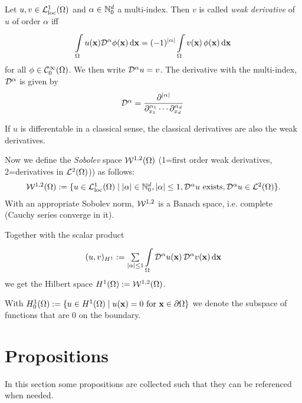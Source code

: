 Let $u,v\in \mathcal{L}^1_{\text{loc}}(\Omega)$ and $\alpha \in \mathbb{N}^d_0$ a multi-index. Then $v$ is called \emph{weak derivative} of $u$ of order $\alpha$ iff
\begin{equation}
  \begin{array}{ll}
    \i{\Omega}{}u(\bfx) \D^\alpha \phi(\bfx) \,\d \bfx = (-1)^{|\alpha|} \i{\Omega}{} v(\bfx)\,\phi(\bfx)\,\d \bfx
  \end{array}
\end{equation}
for all $\phi \in \mathcal{C}^\infty_0(\Omega)$. We then write $\mathcal{D}^\alpha u = v$. The derivative with the multi-index, $\mathcal{D}^\alpha$ is given by
\begin{equation}
  \begin{array}{ll}
    \D^\alpha = \dfrac{\p^{|\alpha|}}{\p^{\alpha_1}_{x_1} \cdots \p^{\alpha_d}_{x_d}}
  \end{array}
\end{equation}

If $u$ is differentable in a classical sense, the classical derivatives are also the weak derivatives. 

Now we define the \emph{Sobolev} space $\mathcal{W}^{1,2}(\Omega)$ (1=first order weak derivatives, 2=derivatives in $\mathcal{L}^2(\Omega)$)) as follows:
\begin{equation}
  \begin{array}{ll}
    \mathcal{W}^{1,2}(\Omega) := \{ u \in \mathcal{L}^1_{\text{loc}}(\Omega) \mid |\alpha| \in \mathbb{N}^d_0, |\alpha| \leq 1, \mathcal{D}^\alpha u \text{ exists}, \mathcal{D}^\alpha u \in \mathcal{L}^2(\Omega)\}.
  \end{array}
\end{equation}
With an appropriate Sobolev norm, $\mathcal{W}^{1,2}$ is a Banach space, i.e. complete (Cauchy series converge in it).

Together with the scalar product
\begin{equation}
  \begin{array}{ll}
    (u,v)_{H^1} := \sum\limits_{|\alpha|\leq 1} \i{\Omega}{}{\D^\alpha u(\bfx) \,\D^\alpha v(\bfx) \,\d\bfx}
  \end{array}
\end{equation}
we get the Hilbert space $H^1(\Omega) := \mathcal{W}^{1,2}(\Omega)$.

With $H^1_0(\Omega) := \{u \in H^1(\Omega) \mid u(\bfx) = 0 \text{ for } \bfx \in \p \Omega\}$ we denote the subspace of functions that are 0 on the boundary.

\section{Propositions}
In this section some propositions are collected such that they can be referenced when needed.

